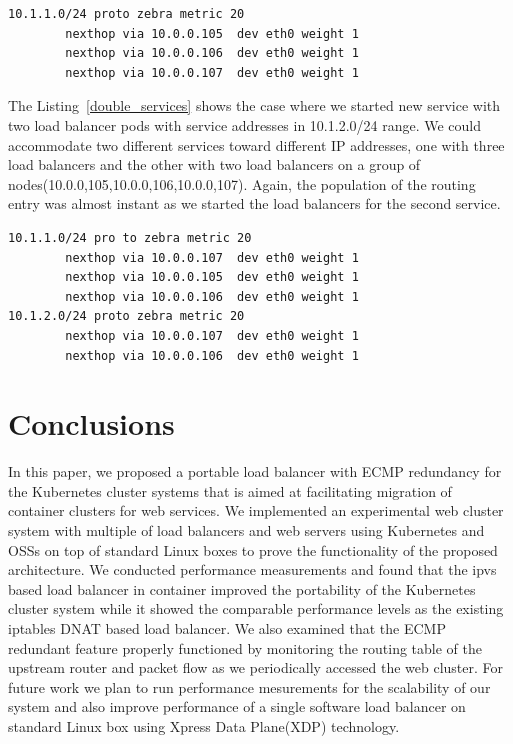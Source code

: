 \begin{lstlisting}[language=bash,caption=Routing table entry with three load balancer pods.,label=three_lb]
10.1.1.0/24 proto zebra metric 20
        nexthop via 10.0.0.105  dev eth0 weight 1
        nexthop via 10.0.0.106  dev eth0 weight 1
        nexthop via 10.0.0.107  dev eth0 weight 1
\end{lstlisting}


The Listing~\ref{double_services} shows the case where we started new service with two load balancer pods with service addresses in 10.1.2.0/24 range.
We could accommodate two different services toward different IP addresses, one with three load balancers and the other with two load balancers on a group of nodes(10.0.0,105,10.0.0,106,10.0.0,107). 
Again, the population of the routing entry was almost instant as we started the load balancers for the second service.


\begin{lstlisting}[language=bash,caption=Routing table entry with additional service with two load balancer pods started.,label=double_services]
10.1.1.0/24 pro to zebra metric 20
        nexthop via 10.0.0.107  dev eth0 weight 1
        nexthop via 10.0.0.105  dev eth0 weight 1
        nexthop via 10.0.0.106  dev eth0 weight 1
10.1.2.0/24 proto zebra metric 20
        nexthop via 10.0.0.107  dev eth0 weight 1
        nexthop via 10.0.0.106  dev eth0 weight 1
\end{lstlisting}


\section{Conclusions}\label{Conclusions}

In this paper, we proposed a portable load balancer with ECMP redundancy for the Kubernetes cluster systems that is aimed at facilitating migration of container clusters for web services.
We implemented an experimental web cluster system with multiple of load balancers and web servers using Kubernetes and OSSs on top of standard Linux boxes to prove the functionality of the proposed architecture.
We conducted performance measurements and found that the ipvs based load balancer in container improved the portability of 
the Kubernetes cluster system while it showed the comparable performance levels as the existing iptables DNAT based load balancer.
We also examined that the ECMP redundant feature properly functioned by monitoring the routing table of the upstream router and packet flow as we periodically accessed the web cluster.
For future work we plan to run performance mesurements for the scalability of our system and also improve performance of a single software load balancer on standard Linux box using Xpress Data Plane(XDP) technology. 



